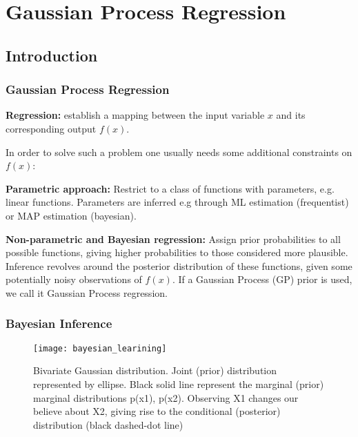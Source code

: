 \documentclass[
	8pt, %
]{beamer}
\begin{document}
\section{Gaussian Process Regression} %

\subsection{Introduction}

\begin{frame}
	\frametitle{Gaussian Process Regression}


	\textbf{Regression:} establish a mapping between the input variable $x$ and its corresponding output $f(x)$.
	\bigskip %

	In order to solve such a problem one usually needs some additional constraints on $f(x)$:

	\bigskip %
	\textbf{Parametric approach:} Restrict to a class of functions with parameters, e.g. linear functions. Parameters
	are inferred e.g through ML estimation (frequentist) or MAP estimation (bayesian).


	\bigskip %
	\textbf{Non-parametric and Bayesian regression:}
	Assign prior probabilities to all possible functions, giving higher probabilities to those considered more plausible.
	Inference revolves around the posterior distribution of these functions,
	given some potentially noisy observations of $f(x)$. If a Gaussian Process (GP) prior is used, we call it
	Gaussian Process regression.

\end{frame}


\begin{frame}
	\frametitle{Bayesian Inference}
	\begin{figure}
			\texttt{[image: bayesian\_learining]}
			\caption{Bivariate Gaussian distribution. Joint (prior) distribution represented by ellipse. Black solid line
			represent the marginal (prior) marginal distributions p(x1), p(x2). Observing X1 changes our believe about
			X2, giving rise to the conditional (posterior) distribution (black dashed-dot line)}
	\end{figure}

\end{frame}
\end{document}
